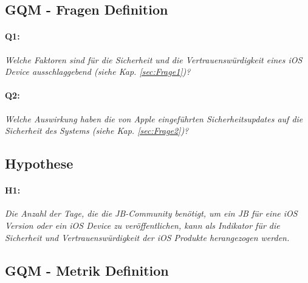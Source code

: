 \subsection{GQM - Fragen Definition}
\label{sec:GQMFragen}

\paragraph{Q1:} \textit{\glqq Welche Faktoren sind für die Sicherheit und die Vertrauenswürdigkeit eines iOS Device ausschlaggebend (siehe Kap. \ref{sec:Frage1})?\grqq{}}
                    
 \paragraph{Q2:} \textit{\glqq Welche Auswirkung haben die von Apple eingeführten Sicherheitsupdates auf die Sicherheit des Systems (siehe Kap. \ref{sec:Frage2})?\grqq{}}
        
\subsection{Hypothese}
\label{sec:GQMHypothese}
\paragraph{H1:} \textit{\glqq Die Anzahl der Tage, die die JB-Community benötigt, um ein JB für eine iOS Version oder ein iOS Device zu veröffentlichen, kann als Indikator für die Sicherheit und Vertrauenswürdigkeit der iOS Produkte herangezogen werden.\grqq{}}

\subsection{GQM - Metrik Definition}
\label{sec:GQMMetrik}

